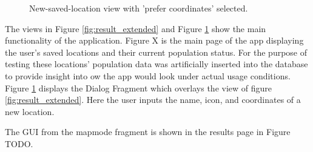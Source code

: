 \begin{figure}
\begin{minipage}{.5\textwidth}
      \caption{New-saved-location view with 'prefer coordinates' selected.}
      \label{fig:result_add}
    \end{minipage}
\end{figure}

The views in Figure \ref{fig:result_extended} and Figure \ref{fig:result_add} show the main functionality of the application. Figure X is the main page of the app displaying the user’s saved locations and their current population status. For the purpose of testing these locations’ population data was artificially inserted into the database to provide insight into ow the app would look under actual usage conditions. Figure \ref{fig:result_add} displays the Dialog Fragment which overlays the view of figure \ref{fig:result_extended}. Here the user inputs the name, icon, and coordinates of a new location.

The GUI from the mapmode fragment is shown in the results page in Figure TODO.

